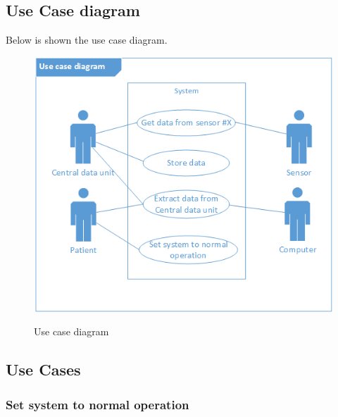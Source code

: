 \subsection{Use Case diagram}
Below is shown the use case diagram.
\begin{figure}[H]
\centering
\includegraphics[width=.8\textwidth]{billeder/usecase_fig.png}
\label{usecase_fig}
\caption{Use case diagram}
\end{figure}

\subsection{Use Cases}

\subsubsection{Set system to normal operation}

